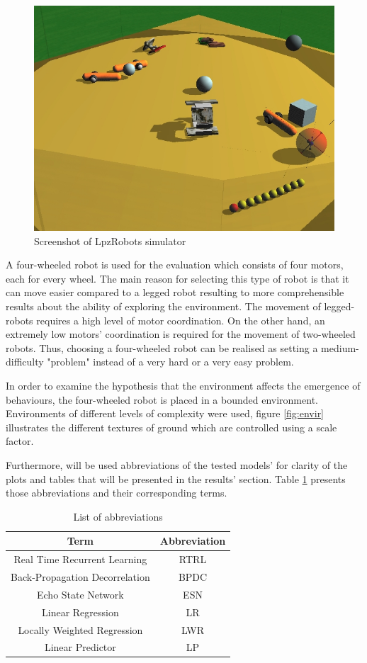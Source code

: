 \documentclass[msc,ai,logo]{infthesis}
\begin{document}
\begin{figure}[H]
\includegraphics[scale=0.3]{zoo.jpg}
\centering
\caption{Screenshot of LpzRobots simulator }
\label{fig:lpzro}
\end{figure}
A four-wheeled robot is used for the evaluation which consists of four motors, each for every wheel. The main reason for selecting this type of robot is that it can move easier compared to a legged robot resulting to more comprehensible results about the ability of exploring the environment. The movement of legged-robots requires a high level of motor coordination. On the other hand, an extremely low motors' coordination is required for the movement of two-wheeled robots. Thus, choosing a four-wheeled robot can be realised as setting a medium-difficulty "problem"  instead of a very hard or a very easy problem. 

In order to examine the hypothesis that the environment affects the emergence of behaviours, the four-wheeled robot is placed in a bounded environment. Environments of different levels of complexity were used, figure \ref{fig:envir} illustrates the different textures of ground which are controlled using a scale factor. 

Furthermore, will be used abbreviations of the tested models' for clarity of the plots and tables that will be presented in the results' section. Table \ref{tab:abbre} presents those abbreviations and their corresponding terms. 
\begin{table}[H]
\centering %
\begin{tabular}{c c} %
Term & Abbreviation \\
\hline
\hline
Real Time Recurrent Learning & RTRL\\
Back-Propagation Decorrelation & BPDC \\
Echo State Network & ESN\\
Linear Regression & LR\\
Locally Weighted Regression & LWR\\
Linear Predictor & LP\\
\hline
\hline
\end{tabular}
\caption{List of abbreviations}
\label{tab:abbre}
\end{table}
\end{document}
